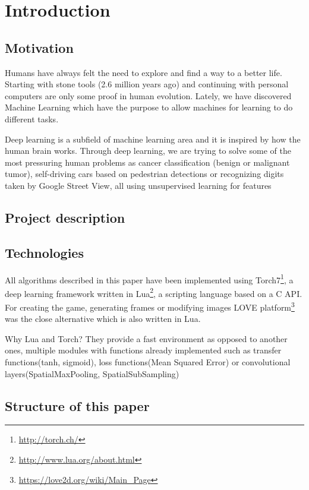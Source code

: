 \chapter{Introduction}
\label{chapter:intro}

\section{Motivation}
\label{sec:motivation}

Humans have always felt the need to explore and find a way to a better life. Starting with stone tools (2.6 million years ago) and continuing with personal computers are only some proof in human evolution. Lately, we have discovered Machine Learning which have the purpose to allow machines for learning to do different tasks.

Deep learning is a subfield of machine learning area and it is inspired by how the human brain works. Through deep learning, we are trying to solve some of the most pressuring human problems as cancer classification (benign or malignant tumor)\cite{mitosis}, self-driving cars based on pedestrian detections\cite{pedestrian} or recognizing digits taken by Google Street View\cite{svhn}, all using unsupervised learning for features



\section{Project description}
\label{sec:proj-description}

\section{Technologies}
\label{sec:technologies}

All algorithms described in this paper have been implemented using Torch7\footnote{\url{http://torch.ch/}}, a deep learning framework written in Lua\footnote{\url{http://www.lua.org/about.html}}, a scripting language based on a C API. For creating the game, generating frames or modifying images LOVE platform\footnote{\url{https://love2d.org/wiki/Main_Page}} was the close alternative which is also written in Lua.

Why Lua and Torch? They provide a fast environment as opposed to another ones\cite{torch7}, multiple modules with functions already implemented such as transfer functions(tanh, sigmoid), loss functions(Mean Squared Error) or convolutional layers(SpatialMaxPooling, SpatialSubSampling)

\section{Structure of this paper}
\label{sec:paper_structure}







